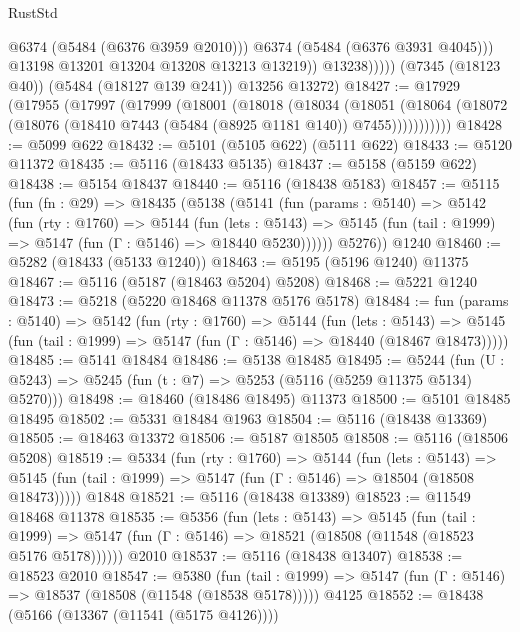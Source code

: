 \begin{lexlean}{RustStd}
\begin{coremodule}
                        @6374
                        (@5484 (@6376 @3959 @2010)))
                      @6374
                      (@5484 (@6376 @3931 @4045)))
                    @13198
                    @13201
                    @13204
                    @13208
                    @13213
                    @13219))
                @13238)))))
      (@7345 (@18123 @40))
      (@5484 (@18127 @139 @241))
      @13256
      @13272)
@18427 := @17929
    (@17955
      (@17997
        (@17999
          (@18001
            (@18018
              (@18034
                (@18051
                  (@18064 (@18072 (@18076 (@18410 @7443 (@5484 (@8925 @1181 @140)) @7455)))))))))))
@18428 := @5099 @622
@18432 := @5101 (@5105 @622) (@5111 @622)
@18433 := @5120 @11372
@18435 := @5116 (@18433 @5135)
@18437 := @5158 (@5159 @622)
@18438 := @5154 @18437
@18440 := @5116 (@18438 @5183)
@18457 := @5115
    (fun (fn : @29) =>
    @18435
      (@5138
        (@5141
          (fun (params : @5140) =>
          @5142
            (fun (rty : @1760) =>
            @5144
              (fun (lets : @5143) =>
              @5145 (fun (tail : @1999) => @5147 (fun (Γ : @5146) => @18440 @5230))))))
        @5276))
    @1240
@18460 := @5282 (@18433 (@5133 @1240))
@18463 := @5195 (@5196 @1240) @11375
@18467 := @5116 (@5187 (@18463 @5204) @5208)
@18468 := @5221 @1240
@18473 := @5218 (@5220 @18468 @11378 @5176 @5178)
@18484 := fun (params : @5140) =>
  @5142
    (fun (rty : @1760) =>
    @5144
      (fun (lets : @5143) =>
      @5145 (fun (tail : @1999) => @5147 (fun (Γ : @5146) => @18440 (@18467 @18473)))))
@18485 := @5141 @18484
@18486 := @5138 @18485
@18495 := @5244
    (fun (U : @5243) => @5245 (fun (t : @7) => @5253 (@5116 (@5259 @11375 @5134) @5270)))
@18498 := @18460 (@18486 @18495) @11373
@18500 := @5101 @18485 @18495
@18502 := @5331 @18484 @1963
@18504 := @5116 (@18438 @13369)
@18505 := @18463 @13372
@18506 := @5187 @18505
@18508 := @5116 (@18506 @5208)
@18519 := @5334
    (fun (rty : @1760) =>
    @5144
      (fun (lets : @5143) =>
      @5145 (fun (tail : @1999) => @5147 (fun (Γ : @5146) => @18504 (@18508 @18473)))))
    @1848
@18521 := @5116 (@18438 @13389)
@18523 := @11549 @18468 @11378
@18535 := @5356
    (fun (lets : @5143) =>
    @5145
      (fun (tail : @1999) =>
      @5147 (fun (Γ : @5146) => @18521 (@18508 (@11548 (@18523 @5176 @5178))))))
    @2010
@18537 := @5116 (@18438 @13407)
@18538 := @18523 @2010
@18547 := @5380
    (fun (tail : @1999) => @5147 (fun (Γ : @5146) => @18537 (@18508 (@11548 (@18538 @5178)))))
    @4125
@18552 := @18438 (@5166 (@13367 (@11541 (@5175 @4126))))

\end{coremodule}
\end{lexlean}
